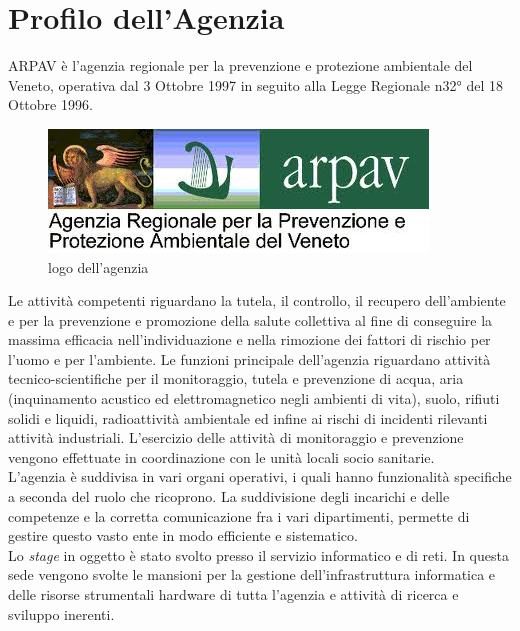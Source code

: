 \chapter{Profilo dell'Agenzia}
\label{1.0}
\thispagestyle{fancy} 

ARPAV è l'agenzia regionale per la prevenzione e protezione ambientale del Veneto, operativa dal 3 Ottobre 1997 in seguito alla Legge Regionale n32° del 18 Ottobre 1996.

\begin{figure}[htbp]
	\centering
	\includegraphics[scale=0.7]{./capitoli/capitolo1/img/logoARPAV.jpg}
	\caption{logo dell'agenzia}
\end{figure}

Le attività competenti riguardano la tutela, il controllo, il recupero dell'ambiente e per la prevenzione e promozione della salute collettiva al fine di conseguire la massima efficacia nell'individuazione e nella rimozione dei fattori di rischio per l'uomo e per l'ambiente. Le funzioni principale dell'agenzia riguardano attività tecnico-scientifiche per il monitoraggio, tutela e prevenzione di acqua, aria (inquinamento acustico ed elettromagnetico negli ambienti di vita), suolo, rifiuti solidi e liquidi, radioattività ambientale ed infine ai rischi di incidenti rilevanti attività industriali. L'esercizio delle attività di monitoraggio e prevenzione vengono effettuate in coordinazione con le unità locali socio sanitarie.\\
L'agenzia è suddivisa in vari organi operativi, i quali hanno funzionalità specifiche a seconda del ruolo che ricoprono. La suddivisione degli incarichi e delle competenze e la corretta comunicazione fra i vari dipartimenti, permette di gestire questo vasto ente in modo efficiente e sistematico.\\
Lo \textit{stage} in oggetto è stato svolto presso il servizio informatico e di reti. In questa sede vengono svolte le mansioni per la gestione dell'infrastruttura informatica e delle risorse strumentali hardware di tutta l'agenzia e attività di ricerca e sviluppo inerenti.

